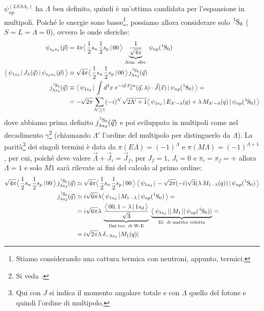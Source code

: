 $\psi_{np}^{(LS\Lambda\Lambda_z)}$ ha $\Lambda$ ben definito, quindi è un'ottima candidata per l'espansione in multipoli. Poiché le energie sono basse\footnote{Stiamo considerando una cattura termica con neutroni, appunto, termici.}, possiamo allora considerare solo $\ce{^1S_0}$ ($S=L=\Lambda = 0$), ovvero le onde sferiche:
\begin{displaymath}
\begin{aligned}
\psi_{s_p s_n}(\vec{p}) &= 4\pi \clebs{\frac{1}{2}s_n\,\frac{1}{2}s_p}{00}\, \underbrace{\frac{1}{\sqrt{4\pi}}}_\text{Arm. sfer.} \, \psi_{np}(\ce{^1S_0}) \\
%
\oss{\psi_{1s_d}}{J_\lambda(\vec{q})}{\psi_{s_p s_n}(\vec{p})} &\equiv \sqrt{4\pi} \clebs{\frac{1}{2}s_n\,\frac{1}{2}s_p}{00}\, j^{\ce{^1S_0}}_{\lambda s_d} (\vec{q}) \\
j^{\ce{^1S_0}}_{\lambda s_d} (\vec{q}) &\equiv \oss{\psi_{1s_d}}{\int d^3x \; e^{-i\vec{q}\cdot\vec{x}}\widehat{\varepsilon}^*(\vec{q},\lambda) \cdot \vec{J}(\vec{x})}{\psi_{np}(\ce{^1S_0})} = \\
&= -\sqrt{2\pi} \sum_{\Lambda'\geq 1} (-i)^{\Lambda'} \sqrt{2\Lambda' +1} \oss{\psi_{1s_d}}{E_{\Lambda'-\lambda}(q)  + \lambda \, M_{\Lambda'-\lambda}(q)}{\psi_{np}(\ce{^1S_0})}
\end{aligned}
\end{displaymath}
dove abbiamo prima definito $j^{\ce{^1S_0}}_{\lambda s_d} (\vec{q})$ e poi sviluppato in multipoli come nel decadimento $\gamma$\footnote{Si veda .} (chiamando $\Lambda'$ l'ordine del multipolo per distinguerlo da $\Lambda$).
La parità\footnote{Qui con $J$ si indica il momento angolare totale e con $\Lambda$ quello del fotone e quindi l'ordine di multipolo.} dei singoli termini è data da $\pi(E\Lambda)=(-1)^\Lambda$ e $\pi(M\Lambda)=(-1)^{\Lambda+1}$, per cui, poiché deve valere $\vec{\Lambda}+\vec{J}_i = \vec{J}_f$, per $J_f = 1$, $J_i = 0$ e $\pi_i=\pi_f=+$ allora $\Lambda = 1$ e solo $M1$ sarà rilevate ai fini del calcolo al primo ordine:
\begin{displaymath}
\begin{aligned}
\sqrt{4\pi} \clebs{\frac{1}{2}s_n\,\frac{1}{2}s_p}{00}\, j^{\ce{^1S_0}}_{\lambda s_d} (\vec{q}) &\simeq \sqrt{4\pi} \clebs{\frac{1}{2}s_n\,\frac{1}{2}s_p}{00}\: \oss{\psi_{1s_d}}{-\sqrt{2\pi}(-i) \sqrt{3} (\lambda\,M_{1-\lambda}(q))}{\psi_{np}(\ce{^1S_0})}\\
j^{\ce{^1S_0}}_{\lambda s_d} (\vec{q})&\simeq i\sqrt{6\pi} \lambda \oss{\psi_{1s_d}}{M_{1\,-\lambda}}{\psi_{np}(\ce{^1S_0})} =\\
&= i \sqrt{6\pi} \lambda \:\underbrace{ \frac{\clebs{00,1-\lambda}{1s_d}}{\sqrt{3}}}_\text{Dal teo. di W-E} \: \underbrace{\bigl \langle \, \psi_{1s_d}\,||\,M_1\,||\,\psi_{np}(\ce{^1S_0})\rangle}_\text{El. di matrice ridotta} = \\
&= i \sqrt{2\pi} \lambda \: \delta_{-\lambda s_d} \: |M_1(q)|
\end{aligned}
\end{displaymath}
